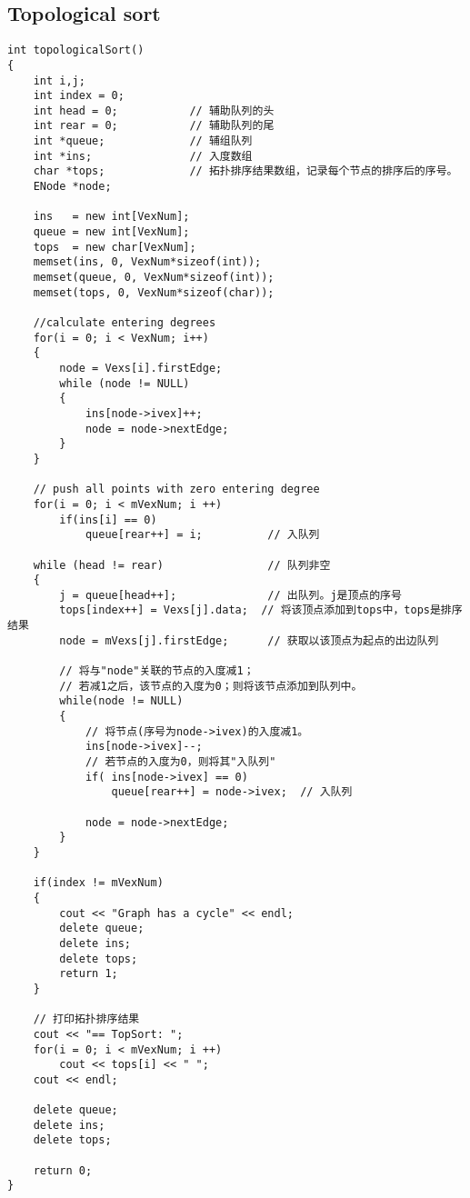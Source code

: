 \subsection{Topological sort}
\begin{lstlisting}
int topologicalSort()
{
    int i,j;
    int index = 0;
    int head = 0;           // 辅助队列的头
    int rear = 0;           // 辅助队列的尾
    int *queue;             // 辅组队列
    int *ins;               // 入度数组
    char *tops;             // 拓扑排序结果数组，记录每个节点的排序后的序号。
    ENode *node;

    ins   = new int[VexNum];
    queue = new int[VexNum];
    tops  = new char[VexNum];
    memset(ins, 0, VexNum*sizeof(int));
    memset(queue, 0, VexNum*sizeof(int));
    memset(tops, 0, VexNum*sizeof(char));
	
	//calculate entering degrees
    for(i = 0; i < VexNum; i++)
    {
        node = Vexs[i].firstEdge;
        while (node != NULL)
        {
            ins[node->ivex]++;
            node = node->nextEdge;
        }
    }

    // push all points with zero entering degree
    for(i = 0; i < mVexNum; i ++)
        if(ins[i] == 0)
            queue[rear++] = i;          // 入队列

    while (head != rear)                // 队列非空
    {
        j = queue[head++];              // 出队列。j是顶点的序号
        tops[index++] = Vexs[j].data;  // 将该顶点添加到tops中，tops是排序结果
        node = mVexs[j].firstEdge;      // 获取以该顶点为起点的出边队列

        // 将与"node"关联的节点的入度减1；
        // 若减1之后，该节点的入度为0；则将该节点添加到队列中。
        while(node != NULL)
        {
            // 将节点(序号为node->ivex)的入度减1。
            ins[node->ivex]--;
            // 若节点的入度为0，则将其"入队列"
            if( ins[node->ivex] == 0)
                queue[rear++] = node->ivex;  // 入队列

            node = node->nextEdge;
        }
    }

    if(index != mVexNum)
    {
        cout << "Graph has a cycle" << endl;
        delete queue;
        delete ins;
        delete tops;
        return 1;
    }

    // 打印拓扑排序结果
    cout << "== TopSort: ";
    for(i = 0; i < mVexNum; i ++)
        cout << tops[i] << " ";
    cout << endl;

    delete queue;
    delete ins;
    delete tops;

    return 0;
}
\end{lstlisting}


